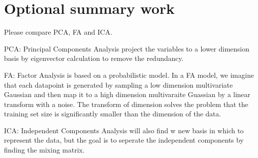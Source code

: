 \documentclass{article}
\newenvironment{answer}{\par\color{ForestGreen}}{\par}
\begin{document}
\section{Optional summary work}
Please compare PCA, FA and ICA.
\begin{answer}
PCA: Principal Components Analysis project the variables to a lower dimension basis by eigenvector calculation to remove the redundancy.

FA: Factor Analysis is based on a probabilistic model. In a FA model, we imagine that each datapoint is generated by sampling a low dimension multivariate Gaussian and then map it to a high dimension multivaraite Guassian by a linear transform with a noise. The transform of dimension solves the problem that the training set size is significantly smaller than the dimension of the data.

ICA: Independent Components Analysis will also find w new basis in which to represent the data, but the goal is to seperate the independent components by finding the mixing matrix.
\end{answer}
\end{document}
